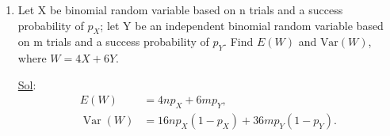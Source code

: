\begin{enumerate}
	\item[20.] Let X be binomial random variable based on n trials and a success probability of \(p_X\); let Y be an independent binomial random variable based on m trials and a success probability of \(p_Y\). Find \(E(W)\) and \(\textrm{Var}(W)\), where \(W = 4X + 6Y\).

	      \underline{Sol}: \\

	      \[
		      \begin{aligned}
			      E(W)                  & = 4n p_X + 6m p_Y,                 \\
			      \operatorname{Var}(W) & = 16n p_X(1-p_X) + 36m p_Y(1-p_Y).
		      \end{aligned}
	      \]
\end{enumerate}
